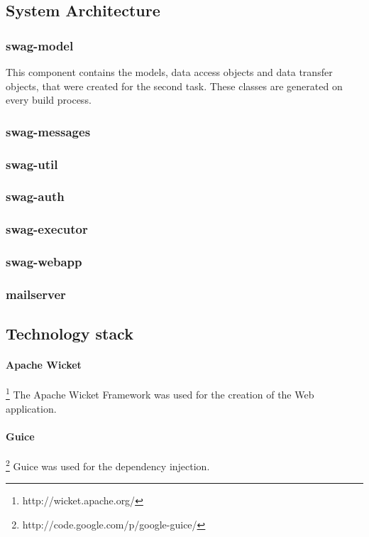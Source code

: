 \documentclass[a4paper]{article}
\begin{document}
\subsection{System Architecture}

\subsubsection{swag-model}
This component contains the models, data access objects and data transfer objects, that were created for the second task. These classes are generated on every build process. 

\subsubsection{swag-messages}

\subsubsection{swag-util}

\subsubsection{swag-auth}

\subsubsection{swag-executor}

\subsubsection{swag-webapp}

\subsubsection{mailserver}


\subsection{Technology stack}
\paragraph{Apache Wicket}\footnote{http://wicket.apache.org/}
The Apache Wicket Framework was used for the creation of the Web application.

\paragraph{Guice}\footnote{http://code.google.com/p/google-guice/}
Guice was used for the dependency injection.
\end{document}
